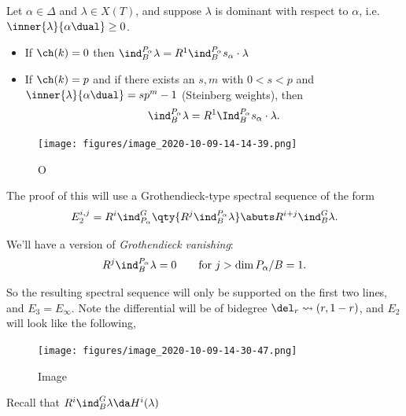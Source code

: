 \begin{corollary}[?]

Let \(\alpha\in \Delta\) and \(\lambda\in X(T)\), and suppose
\(\lambda\) is dominant with respect to \(\alpha\),
i.e.~\(\inner{\lambda}{\alpha\dual} \geq 0\).

\begin{itemize}
\item
  If \(\ch(k) = 0\) then
  \(\ind_B^{P_\alpha}\lambda = R^1 \ind_B^{P_\alpha} s_\alpha \cdot \lambda\)
\item
  If \(\ch(k) = p\) and if there exists an \(s, m\) with \(0<s<p\) and
  \(\inner{\lambda}{\alpha\dual} = sp^m - 1\) (Steinberg weights), then
  \begin{align*}  
  \ind_B^{P_\alpha} \lambda = R^1 \Ind_B^{P_\alpha} s_\alpha \cdot \lambda
  .\end{align*}
\end{itemize}

\begin{figure}
\centering
\texttt{[image: figures/image\_2020-10-09-14-14-39.png]}
\caption{O}
\end{figure}

\end{corollary}

The proof of this will use a Grothendieck-type spectral sequence of the
form
\begin{align*}  
E_2^{i, j} = R^i \ind_{P_\alpha}^G \qty{ R^j \ind_B^{P_\alpha} \lambda} \abuts R^{i+j} \ind_B^G \lambda
.\end{align*}

We'll have a version of \emph{Grothendieck vanishing}:
\begin{align*}  
R^j \ind_B^{P_\alpha} \lambda = 0 \qquad\text{for } j > \dim P_\alpha/B = 1
.\end{align*}

So the resulting spectral sequence will only be supported on the first
two lines, and \(E_3 = E_\infty\). Note the differential will be of
bidegree \(\del_r \leadsto (r, 1-r)\), and \(E_2\) will look like the
following,

\begin{figure}
\centering
\texttt{[image: figures/image\_2020-10-09-14-30-47.png]}
\caption{Image}
\end{figure}

Recall that \(R^i \ind_B^G \lambda \da H^i(\lambda)\)

